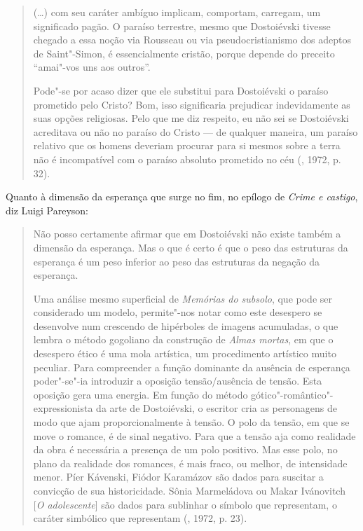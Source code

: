 \begin{quotation}
(\ldots{}) com seu caráter ambíguo implicam, comportam, carregam, um
significado pagão. O paraíso terrestre, mesmo que Dostoiévski tivesse
chegado a essa noção via Rousseau ou via pseudocristianismo dos adeptos
de Saint"-Simon, é essencialmente cristão, porque depende do preceito
``amai"-vos uns aos outros''.

Pode"-se por acaso dizer que ele substitui para Dostoiévski o paraíso
prometido pelo Cristo? Bom, isso significaria prejudicar indevidamente
as suas opções religiosas. Pelo que me diz respeito, eu não sei se
Dostoiévski acreditava ou não no paraíso do Cristo --- de qualquer
maneira, um paraíso relativo que os homens deveriam procurar para si
mesmos sobre a terra não é incompatível com o paraíso absoluto prometido
no céu (, 1972, p. 32).
\end{quotation}

Quanto à dimensão da esperança que surge no fim, no epílogo de
\emph{Crime e castigo}, diz Luigi Pareyson:

\begin{quotation}
Não posso certamente afirmar que em Dostoiévski não existe também a
dimensão da esperança. Mas o que é certo é que o peso das estruturas da
esperança é um peso inferior ao peso das estruturas da negação da
esperança.

Uma análise mesmo superficial de \emph{Memórias do subsolo}, que pode
ser considerado um modelo, permite"-nos notar como este desespero se
desenvolve num crescendo de hipérboles de imagens acumuladas, o que
lembra o método gogoliano da construção de \emph{Almas mortas}, em que o
desespero ético é uma mola artística, um procedimento artístico muito
peculiar. Para compreender a função dominante da ausência de esperança
poder"-se"-ia introduzir a oposição tensão/ausência de tensão. Esta
oposição gera uma energia. Em função do método
gótico"-romântico"-expressionista da arte de Dostoiévski, o escritor cria
as personagens de modo que ajam proporcionalmente à tensão. O polo da
tensão, em que se move o romance, é de sinal negativo. Para que a tensão
aja como realidade da obra é necessária a presença de um polo positivo.
Mas esse polo, no plano da realidade dos romances, é mais fraco, ou
melhor, de intensidade menor. Píer Kávenski, Fiódor Karamázov são dados
para suscitar a convicção de sua historicidade. Sônia Marmeládova ou
Makar Ivánovitch [\emph{O adolescente}] são dados para sublinhar o
símbolo que representam, o caráter simbólico que representam (, 1972, p. 23).
\end{quotation}

